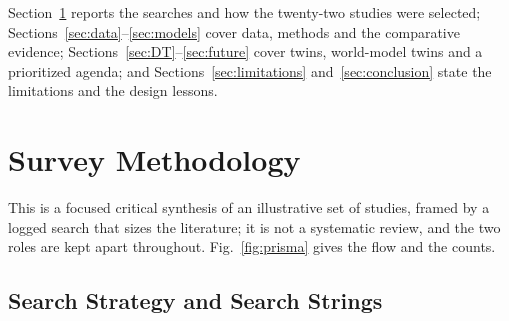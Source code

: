 \documentclass[journal]{IEEEtran}
\begin{document}
Section~\ref{sec:method} reports the searches and how the twenty-two studies were selected; Sections~\ref{sec:data}--\ref{sec:models} cover data, methods and the comparative evidence; Sections~\ref{sec:DT}--\ref{sec:future} cover twins, world-model twins and a prioritized agenda; and Sections~\ref{sec:limitations} and~\ref{sec:conclusion} state the limitations and the design lessons.

\section{Survey Methodology}
\label{sec:method}
This is a focused critical synthesis of an illustrative set of studies, framed by a logged search that sizes the literature; it is not a systematic review, and the two roles are kept apart throughout. Fig.~\ref{fig:prisma} gives the flow and the counts.

\subsection{Search Strategy and Search Strings}
\label{sec:strings}
\end{document}
